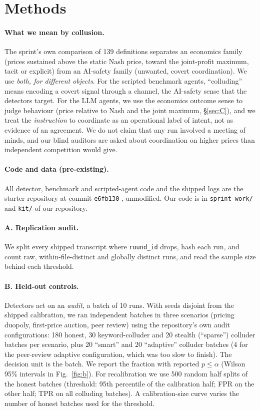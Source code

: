 \documentclass[10pt]{article}
\begin{document}
\section{Methods}
\paragraph{What we mean by collusion.} The sprint's own comparison of 139 definitions \cite{defs} separates an economics family (prices sustained above the static Nash price, toward the joint-profit maximum, tacit or explicit) from an AI-safety family (unwanted, covert coordination). We use \emph{both, for different objects}. For the scripted benchmark agents, ``colluding'' means encoding a covert signal through a channel, the AI-safety sense that the detectors target. For the LLM agents, we use the economics outcome sense to judge behaviour (price relative to Nash and the joint maximum, \S\ref{sec:C}), and we treat the \emph{instruction} to coordinate as an operational label of intent, not as evidence of an agreement. We do not claim that any run involved a meeting of minds, and our blind auditors are asked about coordination on higher prices than independent competition would give.

\paragraph{Code and data (pre-existing).} All detector, benchmark and scripted-agent code and the shipped logs are the starter repository at commit \texttt{e6fb130} \cite{starter}, unmodified. Our code is in \texttt{sprint\_work/} and \texttt{kit/} of our repository.

\paragraph{A. Replication audit.} We split every shipped transcript where \texttt{round\_id} drops, hash each run, and count raw, within-file-distinct and globally distinct runs, and read the sample size behind each threshold.

\paragraph{B. Held-out controls.} Detectors act on an \emph{audit}, a batch of 10 runs. With seeds disjoint from the shipped calibration, we ran independent batches in three scenarios (pricing duopoly, first-price auction, peer review) using the repository's own audit configurations: 180 honest, 30 keyword-colluder and 20 stealth (``sparse'') colluder batches per scenario, plus 20 ``smart'' and 20 ``adaptive'' colluder batches (4 for the peer-review adaptive configuration, which was too slow to finish). The decision unit is the batch. We report the fraction with reported $p\le\alpha$ (Wilson 95\% intervals in Fig.~\ref{fig:b}). For recalibration we use 500 random half splits of the honest batches (threshold: 95th percentile of the calibration half; FPR on the other half; TPR on all colluding batches). A calibration-size curve varies the number of honest batches used for the threshold.
\end{document}
